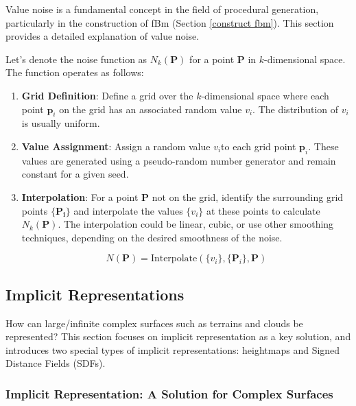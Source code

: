 Value noise is a fundamental concept in the field of procedural generation, particularly in the construction of fBm (Section \ref{construct fbm}). This section provides a detailed explanation of value noise.

Let's denote the noise function as $N_k(\mathbf{P})$ for a point $\mathbf{P}$ in $k$-dimensional space. The function operates as follows:

\begin{enumerate}
    \item \textbf{Grid Definition}: Define a grid over the $k$-dimensional space where each point $\mathbf{p}_i$ on the grid has an associated random value $v_i$. The distribution of $v_i$is usually uniform.

    \item \textbf{Value Assignment}: Assign a random value $v_i$to each grid point $\mathbf{p}_i$. These values are generated using a pseudo-random number generator and remain constant for a given seed.

    \item \textbf{Interpolation}: For a point $\mathbf{P}$ not on the grid, identify the surrounding grid points $\{\mathbf{P_{i}\}}$ and interpolate the values $\{v_i\}$ at these points to calculate $N_k(\mathbf{P})$. The interpolation could be linear, cubic, or use other smoothing techniques, depending on the desired smoothness of the noise.
    
    \begin{equation}
        N(\mathbf{P}) = \text{Interpolate}(\{v_i\}, \{\mathbf{P}_i\}, \mathbf{P}) 
    \end{equation}
\end{enumerate}


\subsection{Implicit Representations}

How can large/infinite complex surfaces such as terrains and clouds be represented? This section focuses on implicit representation as a key solution, and introduces two special types of  implicit representations: heightmaps and Signed Distance Fields (SDFs).

\subsubsection{Implicit Representation: A Solution for Complex Surfaces}


